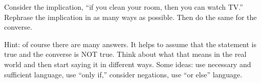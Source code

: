 \begin{questions}
\begin{answer}
  \end{answer}

  
\question Consider the implication, ``if you clean your room, then you can watch TV.''  Rephrase the implication in as many ways as possible.  Then do the same for the converse.

  \begin{answer}
    Hint: of course there are many answers.  It helps to assume that the statement is true and the converse is NOT true.  Think about what that means in the real world and then start saying it in different ways.  Some ideas: use necessary and sufficient language, use ``only if,'' consider negations, use ``or else'' language.
  \end{answer}



\end{questions}